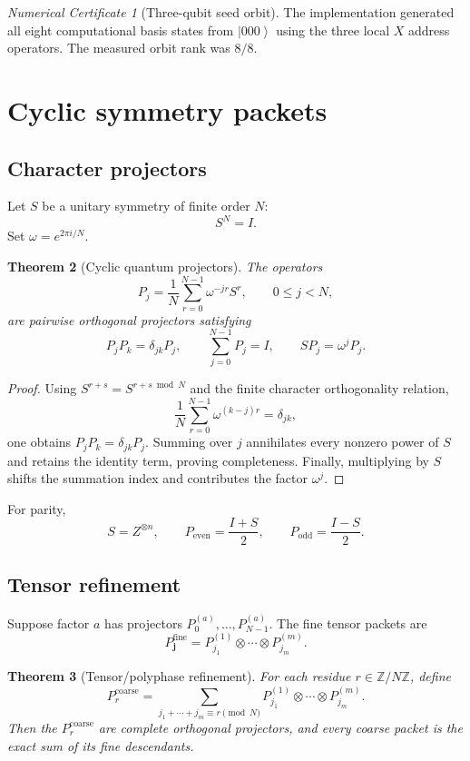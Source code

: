 \documentclass[11pt]{article}
\newtheorem{theorem}{Theorem}[section]
\theoremstyle{definition}
\theoremstyle{remark}
\newtheorem{certificate}[theorem]{Numerical Certificate}
\newcommand{\bbZ}{\mathbb Z}
\newcommand{\ket}[1]{\left|#1\right\rangle}
\begin{document}
\begin{certificate}[Three-qubit seed orbit]
The implementation generated all eight computational basis states from $\ket{000}$ using the three local $X$ address operators. The measured orbit rank was $8/8$.
\end{certificate}

\section{Cyclic symmetry packets}

\subsection{Character projectors}

Let $S$ be a unitary symmetry of finite order $N$:
\[
S^N=I.
\]
Set $\omega=e^{2\pi i/N}$.

\begin{theorem}[Cyclic quantum projectors]
The operators
\[
\boxed{
P_j
=
\frac1N\sum_{r=0}^{N-1}\omega^{-jr}S^r,
\qquad
0\le j<N,
}
\]
are pairwise orthogonal projectors satisfying
\[
P_jP_k=\delta_{jk}P_j,
\qquad
\sum_{j=0}^{N-1}P_j=I,
\qquad
SP_j=\omega^jP_j.
\]
\end{theorem}

\begin{proof}
Using $S^{r+s}=S^{r+s\bmod N}$ and the finite character orthogonality relation,
\[
\frac1N\sum_{r=0}^{N-1}\omega^{(k-j)r}=\delta_{jk},
\]
one obtains $P_jP_k=\delta_{jk}P_j$. Summing over $j$ annihilates every nonzero power of $S$ and retains the identity term, proving completeness. Finally, multiplying by $S$ shifts the summation index and contributes the factor $\omega^j$.
\end{proof}

For parity,
\[
S=Z^{\otimes n},
\qquad
P_{\mathrm{even}}=\frac{I+S}{2},
\qquad
P_{\mathrm{odd}}=\frac{I-S}{2}.
\]

\subsection{Tensor refinement}

Suppose factor $a$ has projectors $P^{(a)}_0,\ldots,P^{(a)}_{N-1}$. The fine tensor packets are
\[
P_{\mathbf j}^{\mathrm{fine}}
=
P^{(1)}_{j_1}\otimes\cdots\otimes P^{(m)}_{j_m}.
\]

\begin{theorem}[Tensor/polyphase refinement]
For each residue $r\in\bbZ/N\bbZ$, define
\[
\boxed{
P_r^{\mathrm{coarse}}
=
\sum_{j_1+\cdots+j_m\equiv r\pmod N}
P^{(1)}_{j_1}\otimes\cdots\otimes P^{(m)}_{j_m}.
}
\]
Then the $P_r^{\mathrm{coarse}}$ are complete orthogonal projectors, and every coarse packet is the exact sum of its fine descendants.
\end{theorem}
\end{document}
